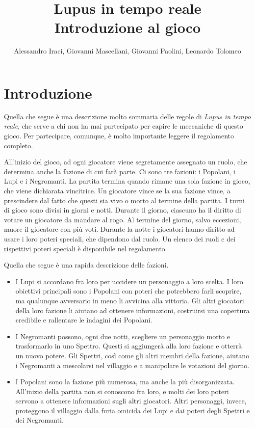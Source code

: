 \documentclass[a4paper,10pt]{article}
\title{Lupus in tempo reale\\ Introduzione al gioco}
\author{Alessandro Iraci, Giovanni Mascellani, Giovanni Paolini, Leonardo Tolomeo}
\begin{document}
\maketitle

\section{Introduzione}

Quella che segue è una descrizione molto sommaria delle regole di \emph{Lupus in tempo reale}, che serve a chi non ha mai partecipato per capire le meccaniche di questo gioco. Per partecipare, comunque, è molto importante leggere il regolamento completo.

All'inizio del gioco, ad ogni giocatore viene segretamente assegnato un ruolo, che determina anche la fazione di cui farà parte. Ci sono tre fazioni: i Popolani, i Lupi e i Negromanti. La partita termina quando rimane una sola fazione in gioco, che viene dichiarata vincitrice. Un giocatore vince se la sua fazione vince, a prescindere dal fatto che questi sia vivo o morto al termine della partita.
I turni di gioco sono divisi in giorni e notti. Durante il giorno, ciascuno ha il diritto di votare un giocatore da mandare al rogo. Al termine del giorno, salvo eccezioni, muore il giocatore con più voti. Durante la notte i giocatori hanno diritto ad usare i loro poteri speciali, che dipendono dal ruolo. Un elenco dei ruoli e dei rispettivi poteri speciali è disponibile nel regolamento.

Quella che segue è una rapida descrizione delle fazioni.

\begin{itemize}
 \item I Lupi si accordano fra loro per uccidere un personaggio a loro scelta. I loro obiettivi principali sono i Popolani con poteri che potrebbero farli scoprire, ma qualunque avversario in meno li avvicina alla vittoria. Gli altri giocatori della loro fazione li aiutano ad ottenere informazioni, costruirsi una copertura credibile e rallentare le indagini dei Popolani.
 \item I Negromanti possono, ogni due notti, scegliere un personaggio morto e trasformarlo in uno Spettro. Questi si aggiungerà alla loro fazione e otterrà un nuovo potere. Gli Spettri, così come gli altri membri della fazione, aiutano i Negromanti a mescolarsi nel villaggio e a manipolare le votazioni del giorno.
 \item I Popolani sono la fazione più numerosa, ma anche la più disorganizzata. All'inizio della partita non si conoscono fra loro, e molti dei loro poteri servono a ottenere informazioni sugli altri giocatori. Altri personaggi, invece, proteggono il villaggio dalla furia omicida dei Lupi e dai poteri degli Spettri e dei Negromanti.
\end{itemize}
\end{document}
